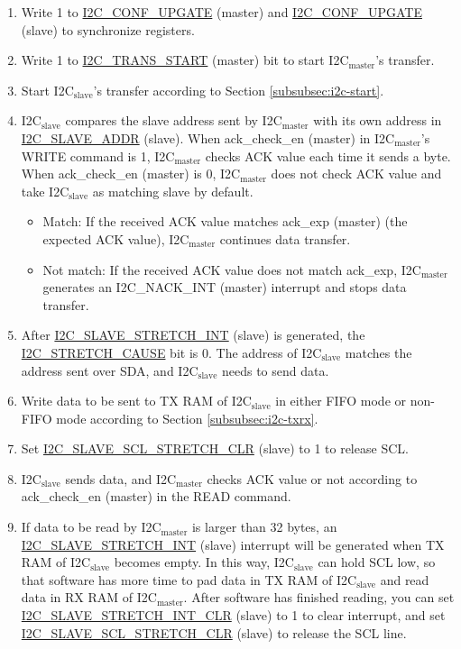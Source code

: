 \documentclass[main\_\_EN.tex]{subfiles}
\begin{document}
\begin{enumerate}
\item Write 1 to \hyperref[fielddesc:I2CCONFUPGATE]{I2C\_CONF\_UPGATE} (master) and \hyperref[fielddesc:I2CCONFUPGATE]{I2C\_CONF\_UPGATE} (slave) to synchronize registers.
\item Write 1 to \hyperref[fielddesc:I2CTRANSSTART]{I2C\_TRANS\_START} (master) bit to start I2C$_\text{master}$'s transfer.
\item Start I2C$_\text{slave}$'s transfer according to Section \ref{subsubsec:i2c-start}.
\item I2C$_\text{slave}$ compares the slave address sent by I2C$_\text{master}$ with its own address in \hyperref[fielddesc:I2CSLAVEADDR]{I2C\_SLAVE\_ADDR} (slave). When ack\_check\_en (master) in I2C$_\text{master}$'s WRITE command is 1, I2C$_\text{master}$ checks ACK value each time it sends a byte. When ack\_check\_en (master) is 0, I2C$_\text{master}$ does not check ACK value and take I2C$_\text{slave}$ as matching slave by default.
\begin{itemize}
\item Match: If the received ACK value matches ack\_exp (master) (the expected ACK value), I2C$_\text{master}$ continues data transfer.
\item Not match: If the received ACK value does not match ack\_exp, I2C$_\text{master}$ generates an I2C\_NACK\_INT (master) interrupt and stops data transfer.
\end{itemize}

\item After \hyperref[int:i2c-slave-stretch]{I2C\_SLAVE\_STRETCH\_INT} (slave) is generated, the \hyperref[fielddesc:I2CSTRETCHCAUSE]{I2C\_STRETCH\_CAUSE} bit is 0. The address of I2C$_\text{slave}$ matches the address sent over SDA, and I2C$_\text{slave}$ needs to send data.
\item Write data to be sent to TX RAM of I2C$_\text{slave}$ in either FIFO mode or non-FIFO mode according to Section \ref{subsubsec:i2c-txrx}.
\item Set \hyperref[fielddesc:I2CSLAVESCLSTRETCHCLR]{I2C\_SLAVE\_SCL\_STRETCH\_CLR} (slave) to 1 to release SCL.

\item I2C$_\text{slave}$ sends data, and I2C$_\text{master}$ checks ACK value or not according to ack\_check\_en (master) in the READ command.

\item If data to be read by I2C$_\text{master}$ is larger than 32 bytes, an \hyperref[int:i2c-slave-stretch]{I2C\_SLAVE\_STRETCH\_INT} (slave) interrupt will be generated when TX RAM of I2C$_\text{slave}$ becomes empty. In this way, I2C$_\text{slave}$ can hold SCL low, so that software has more time to pad data in TX RAM of I2C$_\text{slave}$ and read data in RX RAM of I2C$_\text{master}$. After software has finished reading, you can set \hyperref[fielddesc:I2CSLAVESTRETCHINTCLR]{I2C\_SLAVE\_STRETCH\_INT\_CLR} (slave) to 1 to clear interrupt, and set \hyperref[fielddesc:I2CSLAVESCLSTRETCHCLR]{I2C\_SLAVE\_SCL\_STRETCH\_CLR} (slave) to release the SCL line.


\end{enumerate}
\end{document}
